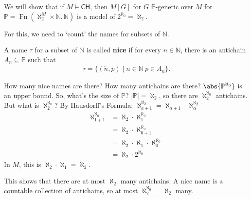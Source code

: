 \documentclass{article}
\newcommand{\p}{\mathbb{P}}
\newcommand{\1}{\mathbbm{1}}
\let\models\vDash
\begin{document}
We will show that if $M \models \textsf{CH}$, then $M[G]$ for $G$ $\p$-generic over $M$ for $\p = \operatorname{Fn}(\aleph_2^M \times \mathbb{N}, \mathbb{N})$ is a model of $2^{\aleph_0} = \aleph_2$.

For this, we need to `count' the names for subsets of $\mathbb{N}$.
\begin{defi}
  A name $\tau$ for a subset of $\mathbb{N}$ is called \textbf{nice} if for every $n \in \mathbb{N}$, there is an antichain $A_n \subseteq \p$ such that
  \begin{align*}
    \tau = \{(\check{n},p) \mid n \in \mathbb{N} \ p \in A_n\}.
  \end{align*}
\end{defi}
How many nice names are there?
How many antichains are there? $\abs{\p^{\aleph_0}}$ is an upper bound. So, what's the size of $\p$?
$|\p| = \aleph_2$, so there are $\aleph_2^{\aleph_0}$ antichains.
But what is $\aleph_2^{\aleph_0}$? By Hausdorff's Formula: $\aleph_{a+1}^{\aleph_\beta} = \aleph_{\alpha+1} \cdot \aleph_\alpha^{\aleph_\beta}$
\begin{align*}
  \aleph_{1+1}^{\aleph_0} &= \aleph_2 \cdot \aleph_1^{\aleph_0} \\
                        &= \aleph_2 \cdot \aleph_{0+1}^{\aleph_0} \\
                        &= \aleph_2 \cdot \aleph_1 \cdot \aleph_0^{\aleph_0} \\
                        &= \aleph_2 \cdot 2^{\aleph_0}
\end{align*}
In $M$, this is $\aleph_2 \cdot \aleph_1 = \aleph_2$.

This shows that there are at most $\aleph_2$ many antichains.
A nice name is a countable collection of antichains, so at most $\aleph_2^{\aleph_0} = \aleph_2$ many.
\end{document}

